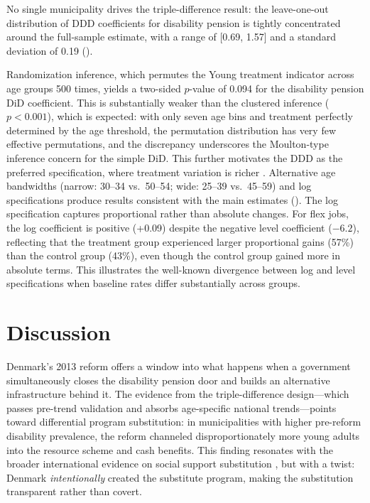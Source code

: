 \documentclass[12pt]{article}
\begin{document}
No single municipality drives the triple-difference result: the leave-one-out distribution of DDD coefficients for disability pension is tightly concentrated around the full-sample estimate, with a range of [0.69, 1.57] and a standard deviation of 0.19 ().

Randomization inference, which permutes the Young treatment indicator across age groups 500 times, yields a two-sided $p$-value of 0.094 for the disability pension DiD coefficient. This is substantially weaker than the clustered inference ($p < 0.001$), which is expected: with only seven age bins and treatment perfectly determined by the age threshold, the permutation distribution has very few effective permutations, and the discrepancy underscores the Moulton-type inference concern for the simple DiD. This further motivates the DDD as the preferred specification, where treatment variation is richer \citep{bertrand2004much}. Alternative age bandwidths (narrow: 30--34 vs.\ 50--54; wide: 25--39 vs.\ 45--59) and log specifications produce results consistent with the main estimates (). The log specification captures proportional rather than absolute changes. For flex jobs, the log coefficient is positive (+0.09) despite the negative level coefficient ($-6.2$), reflecting that the treatment group experienced larger proportional gains (57\%) than the control group (43\%), even though the control group gained more in absolute terms. This illustrates the well-known divergence between log and level specifications when baseline rates differ substantially across groups.


\section{Discussion}
\label{sec:discussion}

Denmark's 2013 reform offers a window into what happens when a government simultaneously closes the disability pension door and builds an alternative infrastructure behind it. The evidence from the triple-difference design---which passes pre-trend validation and absorbs age-specific national trends---points toward differential program substitution: in municipalities with higher pre-reform disability prevalence, the reform channeled disproportionately more young adults into the resource scheme and cash benefits. This finding resonates with the broader international evidence on social support substitution \citep{borghans2014social, karlstrom2008disability, markussen2016leaving}, but with a twist: Denmark \textit{intentionally} created the substitute program, making the substitution transparent rather than covert.
\end{document}
